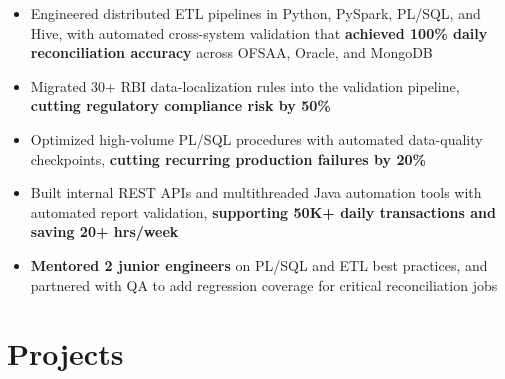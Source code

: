 \documentclass[10pt, letterpaper]{article}
\newenvironment{highlights}{
    \begin{itemize}[
        topsep=0.06 cm,
        parsep=0.06 cm,
        partopsep=0pt,
        itemsep=0pt,
        leftmargin=0 cm + 10pt
    ]
}{
    \end{itemize}
}
\newenvironment{onecolentry}{
    \par\noindent
}{
    \par
}
\begin{document}
\begin{onecolentry}
\begin{highlights}
    \item[--] Engineered distributed ETL pipelines in Python, PySpark, PL/SQL, and Hive, with automated cross-system validation that \textbf{achieved 100\% daily reconciliation accuracy} across OFSAA, Oracle, and MongoDB

    \item[--] Migrated 30+ RBI data-localization rules into the validation pipeline, \textbf{cutting regulatory compliance risk by 50\%}
    
    \item[--] Optimized high-volume PL/SQL procedures with automated data-quality checkpoints, \textbf{cutting recurring production failures by 20\%}
    
    \item[--] Built internal REST APIs and multithreaded Java automation tools with automated report validation, \textbf{supporting 50K+ daily transactions and saving 20+ hrs/week}

    \item[--] \textbf{Mentored 2 junior engineers} on PL/SQL and ETL best practices, and partnered with QA to add regression coverage for critical reconciliation jobs
    \end{highlights}
\end{onecolentry}


\section{Projects}
\end{document}
